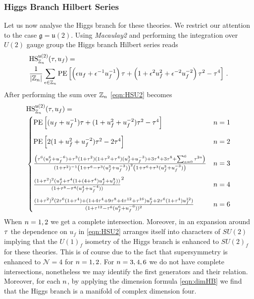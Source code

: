 \documentclass[main.tex]{subfiles}
\begin{document}
\subsubsection{Higgs Branch Hilbert Series}
Let us now analyse the Higgs branch for these theories. We restrict our attention to the case $\mathfrak{g}=\mathfrak{u}(2)$. Using \textit{Macaulay2} and performing the integration over $U(2)$ gauge group the Higgs branch Hilbert series reads
\begin{equation}\label{eqn:HSU2}
\begin{aligned}
&\textrm{HS}_{\mathbb{Z}_{n}}^{\mathfrak{u}(2)}(\tau,u_f) =\\
& \frac{1}{|\mathbb{Z}_{n}|}\sum_{\epsilon \in \mathbb{Z}_{n}}\operatorname{\mathrm{PE}}\left[\left(\epsilon u_f+\epsilon^{-1} u_f^{-1}\right)\tau+\left(1+\epsilon^2 u_f^2+\epsilon^{-2} u_f^{-2}\right)\tau^2-\tau^4 \right] \, .
\end{aligned}
\end{equation}
After performing the sum over $\mathbb{Z}_{n}$ \eqref{eqn:HSU2} becomes
\begin{equation}
\allowdisplaybreaks
\begin{aligned}
&\HS_{\mathbb{Z}_{\kgg}}^{\mathfrak{u}(2)}(\tHS,u_f)=\\
&\begin{cases}\PE\left[(u_f+u_f^{-1})\tHS+(1+u_f^2+u_f^{-2})\tHS^2-\tHS^4\right]&{\kgg}=1\\[12pt]
\PE\left[2(1+u_f^2+u_f^{-2})\tHS^2-2\tHS^4\right]&{\kgg}=2\\[12pt]
\frac{\left(\tHS^6 (u_f^6 + u_f^{-6}) + 
   \tHS^3 (1 + \tHS^2) (1 + \tHS^2 + \tHS^4) (u_f^3 + u_f^{-3}) + 3 \tHS^4 + 3 \tHS^8 +\sum_{a=0}^{6}\tHS^{2a}\right)}{(1 + \tHS^2) ^{-1}\left(1 + \tHS^6 - 
   \tHS^3 (u_f^3 + u_f^{-3})\right)^2 \left(1 + \tHS^6 + \tHS^3 (u_f^3 + u_f^{-3})\right)}&{\kgg}=3\\[12pt]
   \frac{(1 + \tHS^2)^2 (u_f^4 + \tHS^4 (1 + (4 + \tHS^4) u_f^4 + u_f^8))}{(1 + 
  \tHS^8  - \tHS^4 ( u_f^4 + u_f^{-4}))}^2&{\kgg}=4\\[12pt]
 \frac{(1 + \tHS^2)^2  (2 \tHS^6 (1 + \tHS^4) + (1 + 4 \tHS^4 + 9 \tHS^8 + 4 \tHS^{12} + 
      \tHS^{16}) u_f^6 + 2 \tHS^6 (1 + \tHS^4) u_f^{12})}{(1 + \tHS^{12}  - 
  \tHS^6 (u_f^6 + u_f^{-6}))^2} &{\kgg}=6
\end{cases}
\end{aligned}
\end{equation}
When ${n}=1,2$ we get a complete intersection. Moreover, in an expansion around $\tau$ the dependence on $u_f$ in \eqref{eqn:HSU2} arranges itself into characters of $SU(2)$ implying that the $U(1)_f$ isometry of the Higgs branch is enhanced to $SU(2)_f$ for these theories. This is of course due to the fact that supersymmetry is enhanced to $\mathcal{N}=4$ for ${n}=1,2$. For ${n}=3,4,6$ we do not have complete intersections, nonetheless we may identify the first generators and their relation. Moreover, for each ${n}$, by applying the dimension formula \eqref{eqn:dimHB} we find that the Higgs branch is a manifold of complex dimension four.
\end{document}
